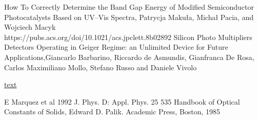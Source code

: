 \documentclass[10pt,a4paper]{article}
\begin{document}
\begin{multicols}{2}
\begin{thebibliography}{9}
How To Correctly Determine the Band Gap Energy of Modified Semiconductor Photocatalysts Based on UV–Vis Spectra, Patrycja Makuła, Michał Pacia, and Wojciech Macyk\\https://pubs.acs.org/doi/10.1021/acs.jpclett.8b02892
Silicon Photo Multipliers Detectors Operating in Geiger Regime: an Unlimited Device for Future Applications,Giancarlo Barbarino, Riccardo de Asmundis, Gianfranca De Rosa, Carlos Maximiliano Mollo, Stefano Russo and Daniele Vivolo


 \href{https://erdogant.github.io/findpeaks/pages/html/Examples.html#find-peaks-in-low-sampled-dataset}{text}


 E Marquez et al 1992 J. Phys. D: Appl. Phys. 25 535
Handbook of Optical Constants of Solids, Edward D. Palik. Academic Press, Boston, 1985 
\end{thebibliography}


\end{multicols}
\end{document}
